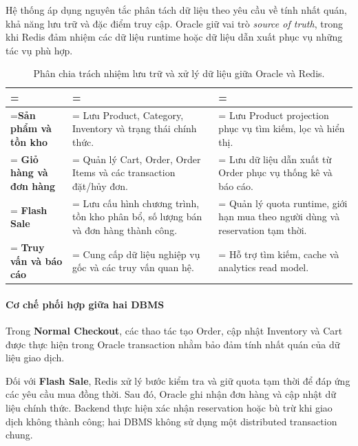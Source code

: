 Hệ thống áp dụng nguyên tắc phân tách dữ liệu theo yêu cầu về tính nhất quán, khả năng lưu trữ và đặc điểm truy cập. Oracle giữ vai trò \emph{source of truth}, trong khi Redis đảm nhiệm các dữ liệu runtime hoặc dữ liệu dẫn xuất phục vụ những tác vụ phù hợp.

\begin{table}[H]
\centering
\caption{Phân chia trách nhiệm lưu trữ và xử lý dữ liệu giữa Oracle và Redis.}\label{tab:intro-data}
\reporttablesetup
\begin{tabularx}{\linewidth}{|>{\hsize\linewidth=\hsize}L|>{\hsize\linewidth=\hsize}L|>{\hsize\linewidth=\hsize}L|}
\hline
{}
 &  &  \\ \hline
\textbf{Sản phẩm và tồn kho} & Lưu Product, Category, Inventory và trạng thái chính thức. & Lưu Product projection phục vụ tìm kiếm, lọc và hiển thị. \\ \hline
\textbf{Giỏ hàng và đơn hàng} & Quản lý Cart, Order, Order Items và các transaction đặt/hủy đơn. & Lưu dữ liệu dẫn xuất từ Order phục vụ thống kê và báo cáo. \\ \hline
\textbf{Flash Sale} & Lưu cấu hình chương trình, tồn kho phân bổ, số lượng bán và đơn hàng thành công. & Quản lý quota runtime, giới hạn mua theo người dùng và reservation tạm thời. \\ \hline
\textbf{Truy vấn và báo cáo} & Cung cấp dữ liệu nghiệp vụ gốc và các truy vấn quan hệ. & Hỗ trợ tìm kiếm, cache và analytics read model. \\ \hline
\end{tabularx}
\end{table}

\paragraph*{Cơ chế phối hợp giữa hai DBMS}

Trong \textbf{Normal Checkout}, các thao tác tạo Order, cập nhật Inventory và Cart được thực hiện trong Oracle transaction nhằm bảo đảm tính nhất quán của dữ liệu giao dịch.

Đối với \textbf{Flash Sale}, Redis xử lý bước kiểm tra và giữ quota tạm thời để đáp ứng các yêu cầu mua đồng thời. Sau đó, Oracle ghi nhận đơn hàng và cập nhật dữ liệu chính thức. Backend thực hiện xác nhận reservation hoặc bù trừ khi giao dịch không thành công; hai DBMS không sử dụng một distributed transaction chung.

